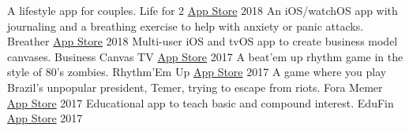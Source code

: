 \begin{cventries}
  \cvcompactentry
    {A lifestyle app for couples.}
    {Life for 2}
    {\href{https://itunes.apple.com/app/id1391853040?mt=8}{App Store}}
    {2018}
  \cvcompactentry
    {An iOS/watchOS app with journaling and a breathing exercise to help with anxiety or panic attacks.}
    {Breather}
    {\href{https://itunes.apple.com/app/id1370659046?mt=8}{App Store}}
    {2018}
  \cvcompactentry
    {Multi-user iOS and tvOS app to create business model canvases.}
    {Business Canvas TV}
    {\href{https://itunes.apple.com/app/id1292335686?mt=8}{App Store}}
    {2017}
  \cvcompactentry
    {A beat'em up rhythm game in the style of 80's zombies.}
    {Rhythm'Em Up}
    {\href{https://itunes.apple.com/app/id1262013610?mt=8}{App Store}}
    {2017}
  \cvcompactentry
    {A game where you play Brazil's unpopular president, Temer, trying to escape from riots.}
    {Fora Memer}
    {\href{https://itunes.apple.com/br/app/fora-memer/id1253655537?l=en&mt=8}{App Store}}
    {2017}
  \cvcompactentry
    {Educational app to teach basic and compound interest.}
    {EduFin}
    {\href{https://itunes.apple.com/app/id1231577657?mt=8}{App Store}}
    {2017}
\end{cventries}

